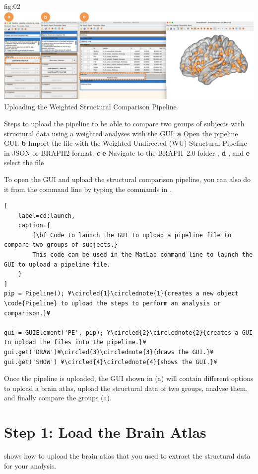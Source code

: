 \documentclass[justified]{tufte-handout}
\begin{document}
	{fig:02}
	{
	\includegraphics{fig02.jpg}
	}
	{Uploading the Weighted Structural Comparison Pipeline}
	{
	Steps to upload the pipeline to be able to compare two groups of subjects with structural data using a weighted analyses with the GUI: 
	{\bf a} Open the pipeline GUI.
	{\bf b} Import the file with the Weighted Undirected (WU) Structural Pipeline in JSON or BRAPH2 format.
	{\bf c}-{\bf e} Navigate to the BRAPH~2.0 folder , {\bf d} , and {\bf e} select the file  

To open the GUI and upload the structural comparison pipeline, you can also do it from the command line by typing the commands in .
%
\begin{lstlisting}[
	label=cd:launch,
	caption={
		{\bf Code to launch the GUI to upload a pipeline file to compare two groups of subjects.}
		This code can be used in the MatLab command line to launch the GUI to upload a pipeline file.
	}
]
pip = Pipeline(); ¥\circled{1}\circlednote{1}{creates a new object \code{Pipeline} to upload the steps to perform an analysis or comparison.}¥

gui = GUIElement('PE', pip); ¥\circled{2}\circlednote{2}{creates a GUI to upload the files into the pipeline.}¥
gui.get('DRAW')¥\circled{3}\circlednote{3}{draws the GUI.}¥
gui.get('SHOW') ¥\circled{4}\circlednote{4}{shows the GUI.}¥
\end{lstlisting}


Once the pipeline is uploaded, the GUI shown in (a) will contain different options to upload a brain atlas, upload the structural data of two groups, analyse them, and finally compare the groups (a). 

\section{Step 1: Load the Brain Atlas}

 shows how to upload the brain atlas that you used to extract the structural data for your analysis.

}
\end{document}
